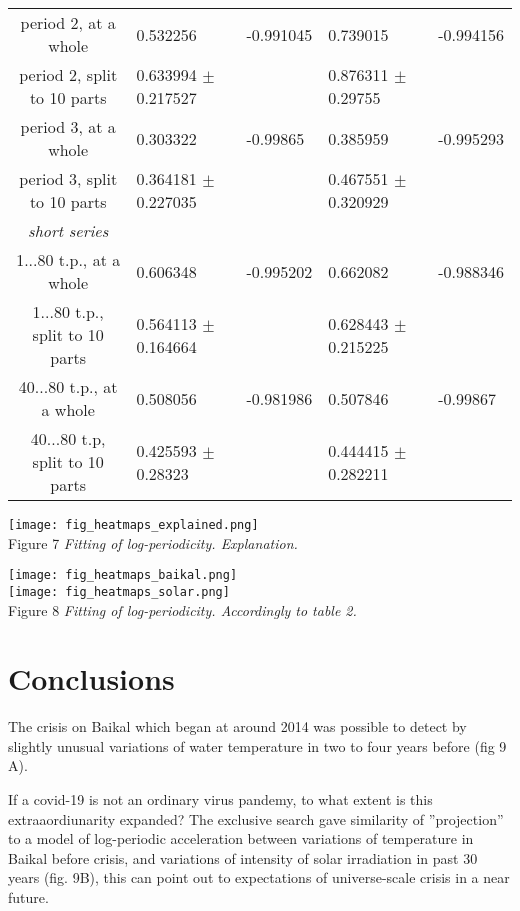 \documentclass[a4paper]{article}
\begin{document}
{\begin{tabular}{cllll}
period 2, at a whole           & 0.532256                 & -0.991045   & 0.739015                 & -0.994156   \\
period 2, split to 10 parts    & 0.633994 $\pm$ 0.217527  &             & 0.876311 $\pm$ 0.29755   &             \\
period 3, at a whole           & 0.303322                 & -0.99865    & 0.385959                 & -0.995293   \\
period 3, split to 10 parts    & 0.364181 $\pm$ 0.227035  &             & 0.467551 $\pm$ 0.320929  &             \\
\textit{short series}\\
1...80 t.p., at a whole        & 0.606348                 & -0.995202   & 0.662082                 & -0.988346   \\
1...80 t.p., split to 10 parts & 0.564113 $\pm$ 0.164664  &             & 0.628443 $\pm$ 0.215225  &             \\
40...80 t.p., at a whole       & 0.508056                 & -0.981986   & 0.507846                 & -0.99867   \\
40...80 t.p, split to 10 parts & 0.425593 $\pm$ 0.28323   &             & 0.444415 $\pm$ 0.282211  &             \\
\hline
\end{tabular}
}

\vskip 12pt

\texttt{[image: fig\_heatmaps\_explained.png]}\\
Figure 7 \textit{Fitting of log-periodicity. Explanation.}

\newpage

\texttt{[image: fig\_heatmaps\_baikal.png]}\\

\texttt{[image: fig\_heatmaps\_solar.png]}\\
Figure 8 \textit{Fitting of log-periodicity. Accordingly to table 2.}

\newpage

\section*{Conclusions}

The crisis on Baikal which began at around 2014 was possible to detect by slightly unusual variations of water temperature in two to four years before (fig 9 A). 

If a covid-19 is not an ordinary virus pandemy, to what extent is this extraaordiunarity expanded? The exclusive search gave similarity of ''projection'' to a model of log-periodic acceleration between variations of temperature in Baikal before crisis, and variations of intensity of solar irradiation in past 30 years (fig. 9B), this can point out to expectations of universe-scale crisis in a near future.
\end{document}
